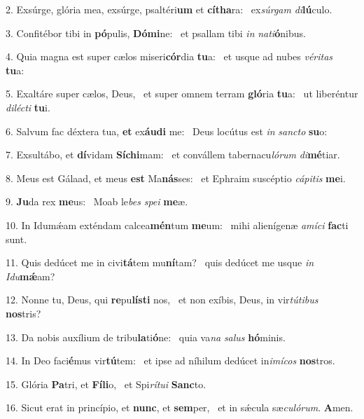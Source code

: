 2. Exsúrge, glória mea, exsúrge, psaltéri\textbf{um} et \textbf{cí}\textbf{tha}ra: \ast\  ex\textit{súr}\textit{gam} \textit{di}\textbf{lú}culo.\

3. Confitébor tibi in \textbf{pó}pulis, \textbf{Dó}\textbf{mi}ne: \ast\  et psallam tibi \textit{in} \textit{na}\textit{ti}\textbf{ó}nibus.\

4. Quia magna est super cælos miseri\textbf{cór}dia \textbf{tu}a: \ast\  et usque ad nubes \textit{vé}\textit{ri}\textit{tas} \textbf{tu}a:\

5. Exaltáre super cælos, Deus, \dag\  et super omnem terram \textbf{gló}ria \textbf{tu}a: \ast\  ut liberéntur \textit{di}\textit{léc}\textit{ti} \textbf{tu}i.\

6. Salvum fac déxtera tua, \textbf{et} ex\textbf{áu}\textbf{di} me: \ast\  Deus locútus est \textit{in} \textit{sanc}\textit{to} \textbf{su}o:\

7. Exsultábo, et \textbf{dí}vidam \textbf{Sí}\textbf{chi}mam: \ast\  et convállem tabernacu\textit{ló}\textit{rum} \textit{di}\textbf{mé}tiar.\

8. Meus est Gálaad, et meus \textbf{est} Ma\textbf{nás}ses: \ast\  et Ephraim suscéptio \textit{cá}\textit{pi}\textit{tis} \textbf{me}i.\

9. \textbf{Ju}da rex \textbf{me}us: \ast\  Moab le\textit{bes} \textit{spe}\textit{i} \textbf{me}æ.\

10. In Idumǽam exténdam calcea\textbf{mén}tum \textbf{me}um: \ast\  mihi alienígenæ \textit{a}\textit{mí}\textit{ci} \textbf{fac}ti sunt.\

11. Quis dedúcet me in civi\textbf{tá}tem mu\textbf{ní}tam? \ast\  quis dedúcet me usque \textit{in} \textit{I}\textit{du}\textbf{mǽ}am?\

12. Nonne tu, Deus, qui \textbf{re}pu\textbf{lís}\textbf{ti} nos, \ast\  et non exíbis, Deus, in vir\textit{tú}\textit{ti}\textit{bus} \textbf{nos}tris?\

13. Da nobis auxílium de tribu\textbf{la}ti\textbf{ó}ne: \ast\  quia va\textit{na} \textit{sa}\textit{lus} \textbf{hó}minis.\

14. In Deo faci\textbf{é}mus vir\textbf{tú}tem: \ast\  et ipse ad níhilum dedúcet in\textit{i}\textit{mí}\textit{cos} \textbf{nos}tros.\

15. Glória \textbf{Pa}tri, et \textbf{Fí}\textbf{li}o, \ast\  et Spi\textit{rí}\textit{tu}\textit{i} \textbf{Sanc}to.\

16. Sicut erat in princípio, et \textbf{nunc}, et \textbf{sem}per, \ast\  et in sǽcula sæ\textit{cu}\textit{ló}\textit{rum}. \textbf{A}men.\

